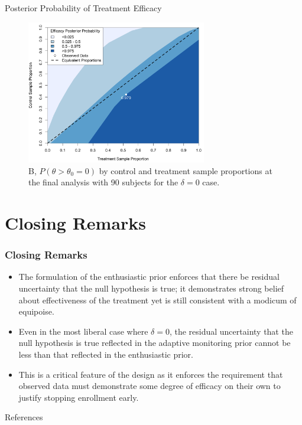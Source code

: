 \documentclass{beamer}
\begin{document}
\begin{frame}{Posterior Probability of Treatment Efficacy}

\vspace{-0.3cm}
\begin{figure}[htbp]
\begin{center}
\includegraphics[width=0.7\textwidth]{./figures/2dpostp.png}
    \caption{B, $P(\theta>\theta_0=0)$ by control and treatment sample proportions at the final analysis with 90 subjects for the $\delta=0$ case.}
\label{fig:2dheatmaps}
 \end{center}
\end{figure}
\end{frame}


\section{Closing Remarks}

\begin{frame} \frametitle{Closing Remarks}
		\begin{itemize}
			\item The formulation of the enthusiastic prior enforces that there be residual uncertainty 
						that the null hypothesis is true; it demonstrates strong belief about effectiveness 
						of the treatment yet is still consistent with a modicum of equipoise.
			
			\vspace{0.75cm}	
			\item Even in the most liberal case where $\delta=0$, the residual uncertainty that the null hypothesis is true 
						reflected in the adaptive monitoring prior cannot be less than that reflected in the 
						enthusiastic prior.
			
			\vspace{0.75cm}	
			\item This is a critical feature of the design as it enforces the requirement that observed data 
			      must demonstrate some degree of efficacy on their own to justify stopping enrollment early.
		 \end{itemize}
\end{frame}


\begin{frame}[t,allowframebreaks]{References}
% 

	
%
\end{frame}
\end{document}
